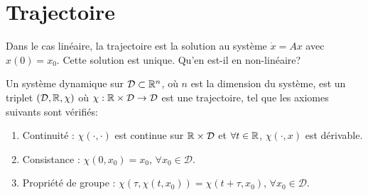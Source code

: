 \documentclass[main.tex]{subfiles}
\newcommand{\D}{\mathcal{D}}
\begin{document}
\section{Trajectoire}

Dans le cas linéaire, la trajectoire est la solution au système $\dot{x}=Ax$ avec $x(0)=x_0$. Cette solution est unique. Qu'en est-il en non-linéaire?

\begin{defin}
Un système dynamique sur $\D \subset \R^n$, où $n$ est la dimension du système, est un triplet $(\D,\R,\chi)$ où $\chi:\R \times \D \rightarrow \D$ est une trajectoire, tel que les axiomes suivants sont vérifiés:
\begin{enumerate}
\item Continuité : $\chi(\cdot,\cdot)$ est continue sur $\R \times \D$ et $\forall t \in \mathbb{R}$, $\chi(\cdot,x)$ est dérivable.
\item Consistance : $\chi(0,x_0)=x_0$, $\forall x_0\in \D$.
\item Propriété de groupe : $\chi(\tau, \chi(t,x_0)) = \chi(t+\tau,x_0)$, $\forall x_0\in \D$.
\end{enumerate}
\end{defin}
\end{document}

